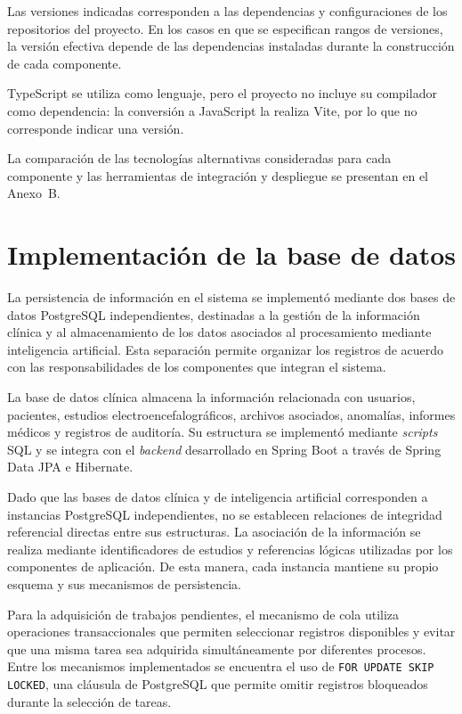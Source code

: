 Las versiones indicadas corresponden a las dependencias y
configuraciones de los repositorios del proyecto.
En los casos en que se especifican rangos de versiones, la
versión efectiva depende de las dependencias instaladas durante
la construcción de cada componente. 
\begin{nuevotextodos}
TypeScript se utiliza como lenguaje, pero el proyecto no incluye su compilador como dependencia: la conversión a JavaScript la realiza Vite, por lo que no corresponde indicar una versión.
\end{nuevotextodos}

\begin{nuevotexto}
La comparación de las tecnologías alternativas consideradas para cada componente y las herramientas de integración y despliegue se presentan en el Anexo~B.
\end{nuevotexto}

\section{Implementación de la base de datos}

La persistencia de información en el sistema se implementó mediante
dos bases de datos PostgreSQL independientes, destinadas a la
gestión de la información clínica y al almacenamiento de los
datos asociados al procesamiento mediante inteligencia
artificial. Esta separación permite organizar los registros
de acuerdo con las responsabilidades de los componentes que
integran el sistema.

La base de datos clínica almacena la información relacionada
con usuarios, pacientes, estudios electroencefalográficos,
archivos asociados, anomalías, informes médicos y registros
de auditoría. Su estructura se implementó mediante \textit{scripts}
SQL y se integra con el \textit{backend} desarrollado en Spring Boot
a través de Spring Data JPA e Hibernate.

Dado que las bases de datos clínica y de inteligencia
artificial corresponden a instancias PostgreSQL
independientes, no se establecen relaciones de integridad
referencial directas entre sus estructuras. La asociación
de la información se realiza mediante identificadores
de estudios y referencias lógicas utilizadas por los
componentes de aplicación. De esta manera, cada instancia
mantiene su propio esquema y sus mecanismos de persistencia.

Para la adquisición de trabajos pendientes, el
mecanismo de cola utiliza operaciones transaccionales
que permiten seleccionar registros disponibles y
evitar que una misma tarea sea adquirida
simultáneamente por diferentes procesos. Entre
los mecanismos implementados se encuentra el uso
de \texttt{FOR UPDATE SKIP LOCKED}, una cláusula
de PostgreSQL que permite omitir registros
bloqueados durante la selección de tareas.

